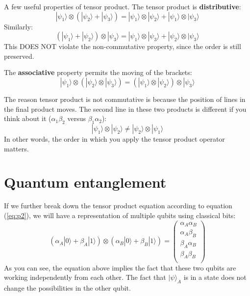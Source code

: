 A few useful properties of tensor product. The tensor product is \textbf{distributive}:
\begin{equation}
    |\psi_1\rangle \otimes (|\psi_2\rangle + |\psi_3\rangle)
    = |\psi_1\rangle \otimes |\psi_2\rangle + |\psi_1\rangle \otimes |\psi_3\rangle
\end{equation}
Similarly:
\[
    (|\psi_1\rangle + |\psi_2\rangle ) \otimes |\psi_3\rangle
        = |\psi_1\rangle \otimes |\psi_3\rangle + |\psi_2\rangle \otimes |\psi_3\rangle
\]
This DOES NOT violate the non-commutative property, since the order is still preserved.

The \textbf{associative} property permits the moving of the brackets:
\begin{equation}
    |\psi_1\rangle \otimes (|\psi_2\rangle \otimes |\psi_3\rangle)
    = (|\psi_1\rangle \otimes |\psi_2\rangle) \otimes |\psi_3\rangle
\end{equation}

The reason tensor product is not commutative is because the position of lines in the final product moves. The second line in these two products is different if you think about it ($\alpha_1\beta_2$ versus $\beta_1\alpha_2$):
\begin{equation}
    |\psi_1\rangle \otimes |\psi_2\rangle
    \neq |\psi_2\rangle \otimes |\psi_1\rangle
\end{equation}
 In other words, the order in which you apply the tensor product operator matters.

\section{Quantum entanglement}
If we further break down the tensor product equation according to equation (\ref{eq:p2}), we will have a representation of multiple qubits using classical bits:
\begin{equation}
    \label{eq:p3}
    (\alpha_A|0\rangle + \beta_A|1\rangle) \otimes
    (\alpha_B|0\rangle + \beta_B|1\rangle)
    = \begin{pmatrix}
        \alpha_A\alpha_B \\
        \alpha_A\beta_B \\
        \beta_A\alpha_B \\
        \beta_A\beta_B \\
    \end{pmatrix}
\end{equation}
As you can see, the equation above implies the fact that these two qubits are working independently from each other. The fact that $|\psi\rangle_A$ is in a state does not change the possibilities in the other qubit.

